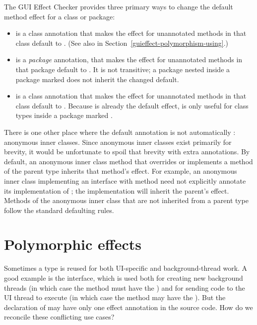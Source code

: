 The GUI Effect Checker provides three primary ways to change the default method effect for a class
or package:
\begin{itemize}
\item
  is a class annotation that makes the effect for unannotated methods in that
class default to
.  (See also  in Section~\ref{guieffect-polymorphism-using}.)
\item
  is a \emph{package} annotation, that makes the effect for unannotated
methods in that package default to .  It is not transitive; a package nested inside
a package marked  does not inherit the changed default.
\item
   is a class annotation that makes the effect for unannotated methods in that
class default to .  Because  is already the default
effect,  is only useful for class types inside a package marked .
\end{itemize}

There is one other place where the default annotation is not automatically :
anonymous inner classes.  Since anonymous inner classes exist primarily for brevity, it would be
unfortunate to spoil that brevity with extra annotations.  By default, an anonymous inner class
method that overrides or implements a method of the parent type inherits that method's effect.
For example, an anonymous inner class implementing an interface with method  need not explicitly annotate its implementation of ; the implementation will inherit
the parent's effect.  Methods of the anonymous inner class that are not inherited from a parent type
follow the standard defaulting rules.

\section{Polymorphic effects\label{guieffect-polymorphism}}
Sometimes a type is reused for both UI-specific and background-thread work.  A good example is the
 interface, which is used both for creating new background threads (in which case the
 method must have the ) and for sending code to the UI thread to
execute (in which case the  method may have the
).  But the declaration of
 may have only one effect annotation in the source code.
How do we reconcile these
conflicting use cases?

